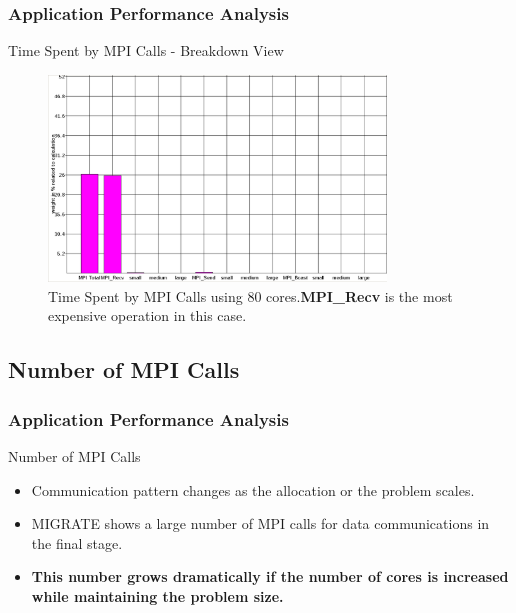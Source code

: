 \documentclass{beamer}
\begin{document}
\begin{frame}[fragile]
  \frametitle{Application Performance Analysis}
\begin{block}{Time Spent by MPI Calls - Breakdown View}
\vspace*{-0.2cm}
\begin{figure}
\includegraphics[width = 0.8\textwidth]{NeSI_img/time_mpi_calls_breakdown.png}
\vspace*{-0.2cm}
\caption{Time Spent by MPI Calls using 80 cores.\textbf{MPI\_Recv} is the most expensive operation in this case.}
\end{figure}
\end{block}
\end{frame} 

\subsection{Number of MPI Calls}
\begin{frame}[fragile]
  \frametitle{Application Performance Analysis}
\begin{block}{Number of MPI Calls}
\begin{itemize}
    \item Communication pattern changes as the allocation or the problem scales.
    \item MIGRATE shows a large number of MPI calls for data communications in the final stage.
    \item \textbf{This number grows dramatically if the number of cores is increased while maintaining the problem size.}
\end{itemize}
\end{block}
\end{frame} 
\end{document}

